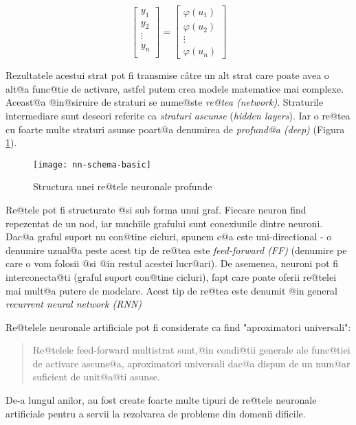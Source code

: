 $$
\begin{bmatrix}
		y_1 \\
		y_2 \\
		\vdots \\ 
		y_n \\
	\end{bmatrix}	
	=
	\begin{bmatrix}
		\varphi (u_1)\\
		\varphi	(u_2) \\
		\vdots \\
		\varphi (u_n)
	\end{bmatrix}
$$

Rezultatele acestui strat pot fi transmise c\^ atre un alt strat care poate avea o alt@a func@tie de activare, astfel putem crea modele matematice mai complexe. Aceast@a @in@siruire de straturi se nume@ste {\sl re@tea (network)}. Straturile intermediare sunt deseori referite ca {\sl straturi ascunse} (\textsl{hidden layers}). Iar o re@tea cu foarte multe straturi asunse poart@a denumirea de {\sl profund@a (deep)} (Figura \ref{nn:schema-basic}).

\begin{figure}[h]
	\centering
	\texttt{[image: nn-schema-basic]}
	\caption{Structura unei re@tele neuronale profunde}
	\label{nn:schema-basic}
\end{figure}


Re@tele pot fi structurate @si sub forma unui graf. Fiecare neuron find repezentat de un nod, iar muchiile grafului sunt conexiunile dintre neuroni. Dac@a graful suport nu con@tine cicluri, spunem c@a este uni-directional - o denumire uzual@a peste acest tip de re@tea este {\sl feed-forward (FF)} (denumire pe care o vom folosii @si @in restul acestei lucr@ari). De asemenea, neuroni pot fi interconecta@ti (graful suport con@tine cicluri), fapt care poate oferii re@telei mai mult@a putere de modelare. Acest tip de re@tea este denumit @in general {\sl recurrent neural network (RNN)}

Re@telele neuronale artificiale pot fi considerate ca find "aproximatori universali"\cite{hornik-nn}: 
\begin{quotation}
	Re@telele feed-forward multistrat sunt,@in condi@tii generale ale func@tiei de activare ascuns@a, aproximatori universali dac@a dispun de un num@ar suficient de unit@a@ti asunse.
\end{quotation}

De-a lungul anilor, au fost create foarte multe tipuri de re@tele neuronale artificiale pentru a servii la rezolvarea de probleme din domenii dificile.

